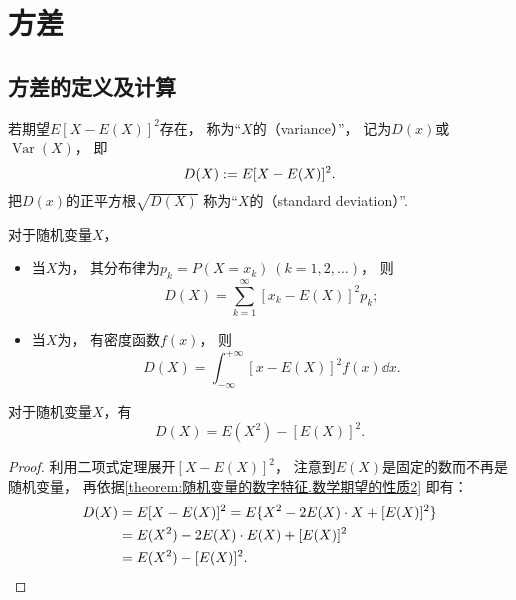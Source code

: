 \section{方差}
\subsection{方差的定义及计算}
\begin{definition}
若期望\(E[X-E(X)]^2\)存在，
称为“\(X\)的（variance）”，
记为\(D(x)\)或\(\operatorname{Var}(X)\)，
即\begin{equation}\label{equation:随机变量的数字特征.方差的定义式}
	D(X) := E[X-E(X)]^2.
\end{equation}
把\(D(x)\)的正平方根\(\sqrt{D(X)}\)
称为“\(X\)的（standard deviation）”.
\end{definition}

\begin{theorem}
对于随机变量\(X\)，
\begin{itemize}
	\item 当\(X\)为，
	其分布律为\(p_k = P(X=x_k)\ (k=1,2,\dotsc)\)，
	则\begin{equation}\label{equation:随机变量的数字特征.离散型方差的计算式}
		D(X) = \sum_{k=1}^\infty [x_k - E(X)]^2 p_k;
	\end{equation}

	\item 当\(X\)为，
	有密度函数\(f(x)\)，
	则\begin{equation}\label{equation:随机变量的数字特征.连续型方差的计算式}
		D(X) = \int_{-\infty}^{+\infty} [x - E(X)]^2 f(x) \dd{x}.
	\end{equation}
\end{itemize}
\end{theorem}

\begin{corollary}\label{theorem:随机变量的数字特征.常用的方差的计算式}
对于随机变量\(X\)，有\begin{equation}
	D(X) = E(X^2) - [E(X)]^2.
\end{equation}
\begin{proof}
利用二项式定理展开\([X-E(X)]^2\)，
注意到\(E(X)\)是固定的数而不再是随机变量，
再依据\cref{theorem:随机变量的数字特征.数学期望的性质2} 即有：
\begin{align*}
	D(X) &= E[X-E(X)]^2
	= E\{X^2 - 2E(X) \cdot X + [E(X)]^2\} \\
	&= E(X^2) - 2E(X) \cdot E(X) + [E(X)]^2 \\
	&= E(X^2) - [E(X)]^2.
	\qedhere
\end{align*}
\end{proof}
\end{corollary}

